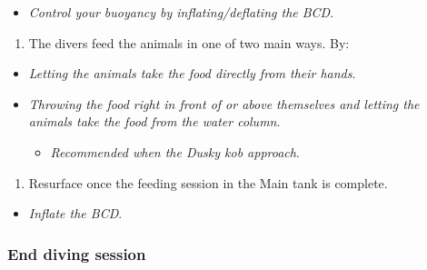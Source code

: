\documentclass[
  letterpaper,
  DIV=11,
  numbers=noendperiod]{scrreprt}
\providecommand{\tightlist}{%
  \setlength{\itemsep}{0pt}\setlength{\parskip}{0pt}}\usepackage{longtable,booktabs,array}
\begin{document}
\begin{itemize}
\tightlist
\item
  \emph{Control your buoyancy by inflating/deflating the BCD}.
\end{itemize}

\begin{enumerate}
\def\labelenumi{\arabic{enumi}.}
\setcounter{enumi}{28}
\tightlist
\item
  The divers feed the animals in one of two main ways. By:
\end{enumerate}

\begin{itemize}
\tightlist
\item
  \emph{Letting the animals take the food directly from their hands}.
\item
  \emph{Throwing the food right in front of or above themselves and
  letting the animals take the food from the water column}.

  \begin{itemize}
  \tightlist
  \item
    \emph{Recommended when the Dusky kob approach}.
  \end{itemize}
\end{itemize}

\begin{enumerate}
\def\labelenumi{\arabic{enumi}.}
\setcounter{enumi}{29}
\tightlist
\item
  Resurface once the feeding session in the Main tank is complete.
\end{enumerate}

\begin{itemize}
\tightlist
\item
  \emph{Inflate the BCD}.
\end{itemize}

\hypertarget{end-diving-session}{%
\subsubsection{End diving session}\label{end-diving-session}}
\end{document}
